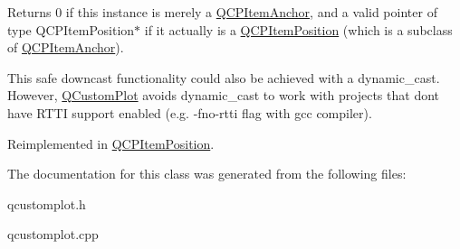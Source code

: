 Returns 0 if this instance is merely a \hyperlink{class_q_c_p_item_anchor}{Q\+C\+P\+Item\+Anchor}, and a valid pointer of type Q\+C\+P\+Item\+Position$\ast$ if it actually is a \hyperlink{class_q_c_p_item_position}{Q\+C\+P\+Item\+Position} (which is a subclass of \hyperlink{class_q_c_p_item_anchor}{Q\+C\+P\+Item\+Anchor}).

This safe downcast functionality could also be achieved with a dynamic\+\_\+cast. However, \hyperlink{class_q_custom_plot}{Q\+Custom\+Plot} avoids dynamic\+\_\+cast to work with projects that don\textquotesingle{}t have R\+T\+TI support enabled (e.\+g. -\/fno-\/rtti flag with gcc compiler). 

Reimplemented in \hyperlink{class_q_c_p_item_position_a008ff9ebe645a963671b68bcf7f7a1c0}{Q\+C\+P\+Item\+Position}.



The documentation for this class was generated from the following files\+:\begin{DoxyCompactItemize}
\item 
qcustomplot.\+h\item 
qcustomplot.\+cpp\end{DoxyCompactItemize}
